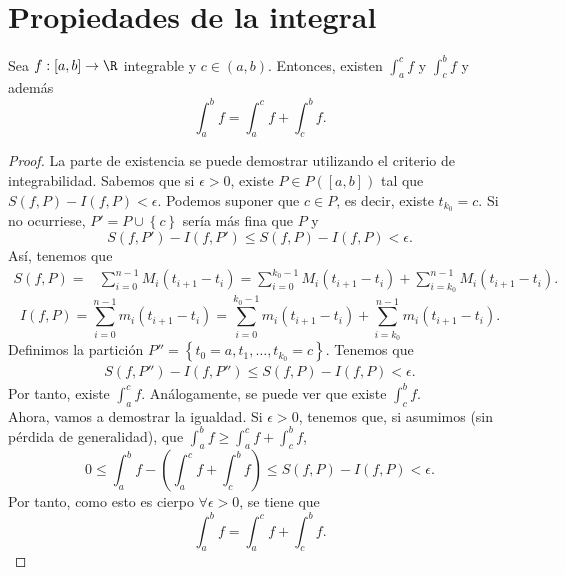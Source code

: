 \section{Propiedades de la integral}
\begin{ftheorem}[]
	\normalfont Sea $\displaystyle f : \left[a,b\right]  \to \R $ integrable y $\displaystyle c \in \left(a,b\right) $. Entonces, existen $\displaystyle \int^{c}_{a} f  $ y $\displaystyle \int^{b}_{c} f  $ y además
	\[ \int^{b}_{a} f = \int^{c}_{a} f + \int^{b}_{c} f .\]
\end{ftheorem}
\begin{proof}
	La parte de existencia se puede demostrar utilizando el criterio de integrabilidad. Sabemos que si $\displaystyle \epsilon > 0 $, existe $\displaystyle P \in P\left([a,b]\right) $ tal que $\displaystyle S\left(f,P\right)-I\left(f,P\right) < \epsilon  $. Podemos suponer que $\displaystyle c \in P $, es decir, existe $\displaystyle t_{k_{0}} =c $. Si no ocurriese, $\displaystyle P' = P \cup \left\{ c\right\}  $ sería más fina que $\displaystyle P $ y 
	\[ S\left(f,P'\right)-I\left(f,P'\right) \leq S\left(f,P\right)-I\left(f,P\right) < \epsilon  .\]
Así, tenemos que 
\[
\begin{split}
	S\left(f,P\right) = & \sum^{n-1}_{i = 0}M_{i}\left(t_{i+1}-t_{i}\right) = \sum^{k_{0}-1}_{i=0}M_{i}\left(t_{i+1}-t_{i}\right) + \sum^{n-1}_{i = k_{0}}M_{i}\left(t_{i+1}-t_{i}\right) .
\end{split}
\]
\[I\left(f,P\right) = \sum^{n-1}_{i=0}m_{i}\left(t_{i+1}-t_{i}\right) = \sum^{k_{0}-1}_{i=0}m_{i}\left(t_{i+1}-t_{i}\right) + \sum^{n-1}_{i=k_{0}}m_{i}\left(t_{i+1}-t_{i}\right) .\]
Definimos la partición $\displaystyle P''= \left\{ t_{0}= a, t_{1}, \ldots, t_{k_{0}}=c\right\}  $. Tenemos que 
\[
\begin{split}
S\left(f,P''\right)-I\left(f,P''\right) \leq S\left(f,P\right) - I\left(f,P\right) < \epsilon .
\end{split}
\]
Por tanto, existe $\displaystyle \int^{c}_{a} f $. Análogamente, se puede ver que existe $\displaystyle \int^{b}_{c} f $. \\ 
Ahora, vamos a demostrar la igualdad. Si $\displaystyle \epsilon > 0 $, tenemos que, si asumimos (sin pérdida de generalidad), que $\displaystyle \int^{b}_{a} f \geq \int^{c}_{a} f +\int^{b}_{c} f $,
\[ 0\leq \int^{b}_{a} f -\left(\int^{c}_{a} f +\int^{b}_{c} f \right) \leq S\left(f,P\right) - I\left(f,P\right) < \epsilon.\]
Por tanto, como esto es cierpo $\displaystyle \forall \epsilon > 0 $, se tiene que 
\[ \int^{b}_{a} f = \int^{c}_{a} f +\int^{b}_{c} f .\]
\end{proof}
